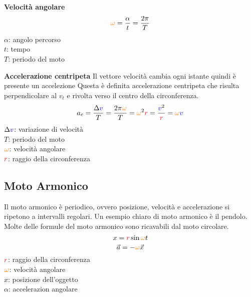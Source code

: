 \textbf{Velocità angolare}
\begin{equation*}
\mathcolor{orange}{\omega} = \frac{\alpha}{t} = \frac{2\pi}{T}
\end{equation*}
$\alpha$: angolo percorso\\ 
$t$: tempo\\
$T$: periodo del moto

\textbf{Accelerazione centripeta}
Il vettore velocità cambia ogni istante quindi è presente un accelezione Questa è definita 
accelerazione centripeta che risulta perpendicolare al $v_t$ e rivolta verso il centro della 
circonferenza.
\begin{equation*}
a_c = \frac{\Delta \mathcolor{blue}{v}}{T} = \frac{2\pi\mathcolor{orange}{\omega}}{T} = 
\mathcolor{orange}{\omega}^2\mathcolor{red}{r} = \frac{\mathcolor{blue}{v}^2}{\mathcolor{red}{r}} = 
\mathcolor{orange}{\omega}\mathcolor{blue}{v}
\end{equation*}
$\Delta\mathcolor{blue}{v}$: variazione di velocità\\
$T$: periodo del moto\\
$\mathcolor{orange}{\omega}$: velocità angolare\\
$\mathcolor{red}{r}$: raggio della circonferenza

\subsection{Moto Armonico}
Il moto armonico è periodico, ovvero posizione, velocità e accelerazione si ripetono a intervalli 
regolari. Un esempio chiaro di moto armonico è il pendolo.\\
Molte delle formule del moto armonico sono ricavabili dal moto circolare.
\begin{equation*}
x = \mathcolor{red}{r}\sin\mathcolor{orange}{\omega}t
\end{equation*}
\begin{equation*}
\vec{a} = -\mathcolor{orange}{\omega}\vec{x}
\end{equation*}
$\mathcolor{red}{r}$: raggio della circonferenza\\
$\mathcolor{orange}{\omega}$: velocità angolare\\
$x$: posizione dell'oggetto\\
$\alpha$: accelerazion angolare

